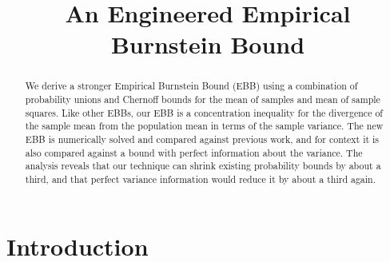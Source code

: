 \documentclass[aap,preprint]{imsart}
\begin{document}
\begin{frontmatter}

\title{An Engineered Empirical Burnstein Bound}

\begin{aug}
\author{ \corref{}
}
\address{Mark Alexander Burgess\\College of Engineering \& Computer Science\\Australian National University\\Canberra, ACT, Australia, 2600\\\\
}
\end{aug}


\begin{abstract}
We derive a stronger Empirical Burnstein Bound (EBB) using a combination of probability unions and Chernoff bounds for the mean of samples and mean of sample squares.
Like other EBBs, our EBB is a concentration inequality for the divergence of the sample mean from the population mean in terms of the sample variance.
The new EBB is numerically solved and compared against previous work, and for context it is also compared against a bound with perfect information about the variance.
The analysis reveals that our technique can shrink existing probability bounds by about a third, and that perfect variance information would reduce it by about a third again.
\end{abstract}

\begin{keyword}[class=MSC]
\kwd[60E15]{}
\kwd[; 62H10]{}
\end{keyword}

\begin{keyword}
\end{keyword}

\end{frontmatter}






\section{Introduction}
\end{document}
